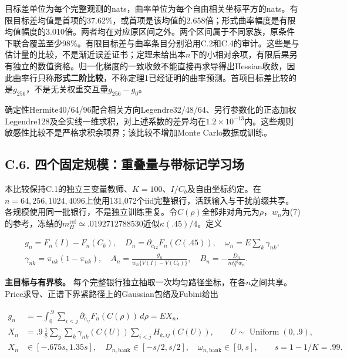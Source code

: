 \documentclass[11pt,a4paper]{article}
\begin{document}
目标差单位为每个完整观测的nats，曲率单位为每个自由相关坐标平方的nats。有限目标差均值是首项的37.62\%，或首项是该均值的2.658倍；形式曲率幅度是有限均值幅度的3.010倍。两者均在对应原区间之外。两个区间属于不同家族，原条件下联合覆盖至少98\%。有限目标差与曲率条目分别沿用C.2和C.4的审计。这些是与估计量的比较，不是渐近误差证书；定理未给出本\(n\)下的小相对余项，有限后果另有独立的数值资格。归一化梯度的一致收敛不能直接再求导得出Hessian收敛，因此曲率行只称\textbf{形式二阶比较}，不称定理1已经证明的曲率预测。首项目标差比较的是\(g_{256}\)，不是无关权重交互量\(g_{256}-g_0\)。

确定性Hermite40/64/96配合相关方向Legendre32/48/64、另行参数化的正态加权Legendre128及全实线一维求积，对上述系数的差异均在\(1.2\times10^{-13}\)内。这些规则敏感性比较不是严格求积余项界；该比较不增加Monte
Carlo数据或训练。

\subsection*{C.6.
四个固定规模：重叠量与带标记学习场}\label{c.6.-ux56dbux4e2aux56faux5b9aux89c4ux6a21ux91cdux53e0ux91cfux4e0eux5e26ux6807ux8bb0ux5b66ux4e60ux573a}

本比较保持C.1的独立三变量教师、\(K=100\)、\(I/C_b\)及自由坐标约定。在\(n=64,256,1024,4096\)上使用131,072个iid完整银行，活跃输入与干扰前缀共享。各规模使用同一批银行，不是独立训练重复。令\(C(\rho)\)全部非对角元为\(\rho\)，\(w_n\)为(7)的参考，冻结的\(m_H^{\mathrm{ref}}\simeq.0192712788530\)近似\(\kappa(.45)/4\)。定义

\[
\begin{gathered}
g_n=F_n(I)-F_n(C_b),\quad D_n=\partial_{c_{12}}F_n(C(.45)),\quad
\omega_n=E\sum_k\gamma_{nk},\\
\gamma_{nk}=\pi_{nk}(1-\pi_{nk}),\quad
A_n=\frac{g_n}{w_n\{V(I)-V(C_b)\}},\quad B_n=-\frac{D_n}{m_H^{\mathrm{ref}}w_n}.
\end{gathered}
\tag{C.15}
\]

\textbf{主目标与有界核。}
每个完整银行独立抽取一次均匀路径坐标，在各\(n\)之间共享。Price求导、正谱下界紧路径上的Gaussian包络及Fubini给出

\[
\begin{aligned}
g_n&=-\int_0^{.9}\sum_{i<j}\partial_{c_{ij}}F_n(C(\rho))\,d\rho=EX_n,\\
X_n&=.9\,\frac18\sum_y\sum_k\gamma_{nk}(C(U))\sum_{i<j}H_{k,ij}(C(U)),
\qquad U\sim\operatorname{Uniform}(0,.9),\\
X_n&\in[-.675s,1.35s],\quad D_{n,\mathrm{bank}}\in[-s/2,s/2],\quad
\omega_{n,\mathrm{bank}}\in[0,s],\qquad s=1-1/K=.99.
\end{aligned}
\tag{C.16}
\]
\end{document}
